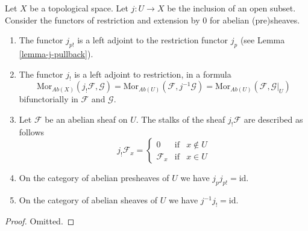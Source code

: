 \begin{lemma}
\label{lemma-j-shriek-abelian}
Let $X$ be a topological space.
Let $j : U \to X$ be the inclusion of an open subset.
Consider the functors of restriction and extension
by $0$ for abelian (pre)sheaves.
\begin{enumerate}
\item The functor $j_{p!}$ is a left adjoint to the
restriction functor $j_p$ (see Lemma \ref{lemma-j-pullback}).
\item The functor $j_!$ is a left adjoint to restriction,
in a formula
$$
\text{Mor}_{\textit{Ab}(X)}(j_!\mathcal{F}, \mathcal{G})
=
\text{Mor}_{\textit{Ab}(U)}(\mathcal{F}, j^{-1}\mathcal{G})
=
\text{Mor}_{\textit{Ab}(U)}(\mathcal{F}, \mathcal{G}|_U)
$$
bifunctorially in $\mathcal{F}$ and $\mathcal{G}$.
\item Let $\mathcal{F}$ be an abelian sheaf on $U$.
The stalks of the sheaf $j_!\mathcal{F}$ are described
as follows
$$
j_{!}\mathcal{F}_x =
\left\{
\begin{matrix}
0 & \text{if} & x \not \in U \\
\mathcal{F}_x & \text{if} & x \in U 
\end{matrix}
\right.
$$
\item On the category of abelian presheaves of $U$
we have $j_pj_{p!} = \text{id}$.
\item On the category of abelian sheaves of $U$
we have $j^{-1}j_! = \text{id}$.
\end{enumerate}
\end{lemma}

\begin{proof}
Omitted.
\end{proof}

